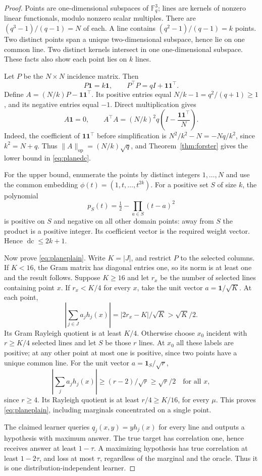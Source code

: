 \documentclass[11pt]{article}
\DeclareMathOperator{\dc}{dc}
\newcommand{\1}{\mathbf 1}
\newcommand{\op}{\mathrm{op}}
\begin{document}
\begin{proof}
Points are one-dimensional subspaces of $\mathbb F_q^3$; lines are kernels of nonzero linear functionals, modulo nonzero scalar multiples. There are $(q^3-1)/(q-1)=N$ of each. A line contains $(q^2-1)/(q-1)=k$ points. Two distinct points span a unique two-dimensional subspace, hence lie on one common line. Two distinct kernels intersect in one one-dimensional subspace. These facts also show each point lies on $k$ lines.

Let $P$ be the $N\times N$ incidence matrix. Then
\[
 P\1=k\1,\qquad P^\top P=qI+\1\1^\top.
\]
Define $A=(N/k)P-\1\1^\top$. Its positive entries equal $N/k-1=q^2/(q+1)\geq1$, and its negative entries equal $-1$. Direct multiplication gives
\[
 A\1=0,\qquad
 A^\top A=(N/k)^2q\left(I-\frac{\1\1^\top}{N}\right).
\]
Indeed, the coefficient of $\1\1^\top$ before simplification is $N^2/k^2-N=-Nq/k^2$, since $k^2=N+q$. Thus $\|A\|_\op=(N/k)\sqrt q$, and Theorem~\ref{thm:forster} gives the lower bound in \eqref{eq:planedc}.

For the upper bound, enumerate the points by distinct integers $1,\ldots,N$ and use the common embedding
$\phi(t)=(1,t,\ldots,t^{2k})$. For a positive set $S$ of size $k$, the polynomial
\[
 p_S(t)=\tfrac12-\prod_{a\in S}(t-a)^2
\]
is positive on $S$ and negative on all other domain points: away from $S$ the product is a positive integer. Its coefficient vector is the required weight vector. Hence $\dc\leq2k+1$.

Now prove \eqref{eq:planeplain}. Write $K=|J|$, and restrict $P$ to the selected columns. If $K<16$, the Gram matrix has diagonal entries one, so its norm is at least one and the result follows. Suppose $K\geq16$ and let $r_x$ be the number of selected lines containing point $x$.
If $r_x<K/4$ for every $x$, take the unit vector $a=\1/\sqrt K$. At each point,
\[
 |\textstyle\sum_{j\in J}a_jh_j(x)|=|2r_x-K|/\sqrt K>\sqrt K/2.
\]
Its Gram Rayleigh quotient is at least $K/4$. Otherwise choose $x_0$ incident with $r\geq K/4$ selected lines and let $S$ be those $r$ lines. At $x_0$ all these labels are positive; at any other point at most one is positive, since two points have a unique common line. For the unit vector $a=\1_S/\sqrt r$,
\[
 |\textstyle\sum_j a_jh_j(x)|\geq(r-2)/\sqrt r\geq\sqrt r/2
 \quad\text{for all }x,
\]
since $r\geq4$. Its Rayleigh quotient is at least $r/4\geq K/16$, for every $\mu$. This proves \eqref{eq:planeplain}, including marginals concentrated on a single point.

The claimed learner queries $q_j(x,y)=y h_j(x)$ for every line and outputs a hypothesis with maximum answer. The true target has correlation one, hence receives answer at least $1-\tau$. A maximizing hypothesis has true correlation at least $1-2\tau$, and loss at most $\tau$, regardless of the marginal and the oracle. Thus it is one distribution-independent learner.


\end{proof}
\end{document}
